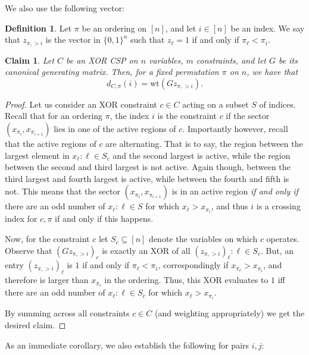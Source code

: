 \documentclass[11pt]{article}
\newtheorem{claim}[theorem]{Claim}
\theoremstyle{definition}
\newtheorem{definition}{Definition}[section]
\newcommand{\zo}{\{0, 1\}}
\newcommand{\wt}{\mathrm{wt}}
\begin{document}
We also use the following vector:

\begin{definition}
	Let $\pi$ be an ordering on $[n]$, and let $i \in [n]$ be an index. We say that $z_{\pi, > i}$ is the vector in $\zo^n$ such that $z_{\ell} = 1$ if and only if $\pi_{\ell} < \pi_i$.
\end{definition}

\begin{claim}\label{clm:crossingEquivalence}
	Let $C$ be an XOR CSP on $n$ variables, $m$ constraints, and let $G$ be its canonical generating matrix. Then, for a fixed permutation $\pi$ on $n$, we have that 
	\[
	d_{C, \pi}(i) = \wt(G z_{\pi, > i}).
	\]
\end{claim}

\begin{proof}
	Let us consider an XOR constraint $c \in C$ acting on a subset $S$ of indices. Recall that for an ordering $\pi$, the index $i$ is  the constraint $c$ if the sector $(x_{\pi_i}, x_{\pi_{i+1}})$ lies in one of the active regions of $c$. Importantly however, recall that the active regions of $c$ are alternating. That is to say, the region between the largest element in $x_{\ell}: \ell \in S_c$ and the second largest is active, while the region between the second and third largest is not active. Again though, between the third largest and fourth largest is active, while between the fourth and fifth is not. This means that the sector $(x_{\pi_i}, x_{\pi_{i+1}})$ is in an active region \emph{if and only if} there are an odd number of $x_{\ell}: \ell \in S$ for which $x_{\ell} > x_{\pi_i}$, and thus $i$ is a crossing index for $c, \pi$ if and only if this happens.
	
	Now, for the constraint $c$ let $S_c \subseteq [n]$ denote the variables on which $c$ operates. Observe that $(G z_{\pi, > i})_c$ is exactly an XOR of all $(z_{\pi, > i})_{\ell}: \ell \in S_c$. But, an entry $(z_{\pi, > i})_{\ell}$ is $1$ if and only if $\pi_{\ell} < \pi_i$, correspondingly if $x_{\pi_{\ell}} > x_{\pi_i}$, and therefore is larger than $x_{\pi_i}$ in the ordering. Thus, this XOR evaluates to $1$ iff there are an odd number of $x_{\ell}: \ell \in S_c$ for which $x_{\ell} > x_{\pi_i}$.
	
	By summing across all constraints $c \in C$ (and weighting appropriately) we get the desired claim. 
\end{proof}

As an immediate corollary, we also establish the following for pairs $i,j$:
\end{document}
